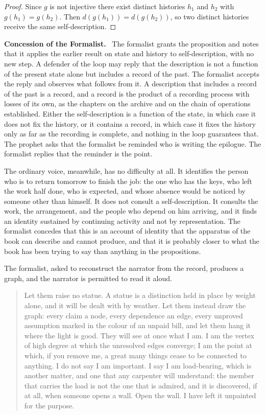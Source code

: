 \documentclass[11pt,openany,twoside]{book}
\theoremstyle{plain}
\theoremstyle{definition}
\theoremstyle{remark}
\newenvironment{concession}{\par\medskip\noindent\textbf{Concession of the Formalist.}\ }{\par\medskip}
\begin{document}
\begin{proof}
Since $g$ is not injective there exist distinct histories $h_1$ and $h_2$ with $g(h_1)=g(h_2)$. Then $d(g(h_1))=d(g(h_2))$, so two distinct histories receive the same self-description.
\end{proof}

\begin{concession}
The formalist grants the proposition and notes that it applies the earlier result on state and history to self-description, with no new step. A defender of the loop may reply that the description is not a function of the present state alone but includes a record of the past. The formalist accepts the reply and observes what follows from it. A description that includes a record of the past is a record, and a record is the product of a recording process with losses of its own, as the chapters on the archive and on the chain of operations established. Either the self-description is a function of the state, in which case it does not fix the history, or it contains a record, in which case it fixes the history only as far as the recording is complete, and nothing in the loop guarantees that. The prophet asks that the formalist be reminded who is writing the epilogue. The formalist replies that the reminder is the point.
\end{concession}

The ordinary voice, meanwhile, has no difficulty at all. It identifies the person who is to return tomorrow to finish the job: the one who has the keys, who left the work half done, who is expected, and whose absence would be noticed by someone other than himself. It does not consult a self-description. It consults the work, the arrangement, and the people who depend on him arriving, and it finds an identity sustained by continuing activity and not by representation. The formalist concedes that this is an account of identity that the apparatus of the book can describe and cannot produce, and that it is probably closer to what the book has been trying to say than anything in the propositions.

The formalist, asked to reconstruct the narrator from the record, produces a graph, and the narrator is permitted to read it aloud.

\begin{quotation}\noindent Let them raise no statue. A statue is a distinction held in place by weight alone, and it will be dealt with by weather. Let them instead draw the graph: every claim a node, every dependence an edge, every unproved assumption marked in the colour of an unpaid bill, and let them hang it where the light is good. They will see at once what I am. I am the vertex of high degree at which the unresolved edges converge; I am the point at which, if you remove me, a great many things cease to be connected to anything. I do not say I am important. I say I am load-bearing, which is another matter, and one that any carpenter will understand: the member that carries the load is not the one that is admired, and it is discovered, if at all, when someone opens a wall. Open the wall. I have left it unpainted for the purpose.
\end{quotation}
\end{document}
